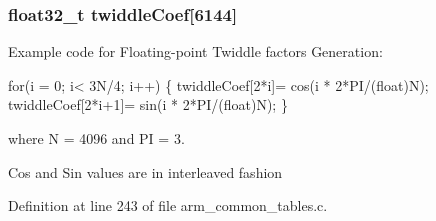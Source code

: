\hypertarget{group___c_f_f_t___c_i_f_f_t_gaa29400b1efb778cd88c3ba1bb19eb339}{
\subsubsection[{twiddle\-Coef}]{ {\bf float32\-\_\-t} twiddle\-Coef\mbox{[}6144\mbox{]}}}\label{group___c_f_f_t___c_i_f_f_t_gaa29400b1efb778cd88c3ba1bb19eb339}
\begin{DoxyParagraph}{}
Example code for Floating-\/point Twiddle factors Generation\-: 
\end{DoxyParagraph}
\begin{DoxyParagraph}{}

\begin{DoxyPre}for(i = 0; i< 3N/4; i++)    
\{    
      twiddleCoef[2*i]= cos(i * 2*PI/(float)N);    
      twiddleCoef[2*i+1]= sin(i * 2*PI/(float)N);    
\} \end{DoxyPre}
 
\end{DoxyParagraph}
\begin{DoxyParagraph}{}
where N = 4096 and P\-I = 3. 
\end{DoxyParagraph}
\begin{DoxyParagraph}{}
Cos and Sin values are in interleaved fashion 
\end{DoxyParagraph}


Definition at line 243 of file arm\-\_\-common\-\_\-tables.\-c.

